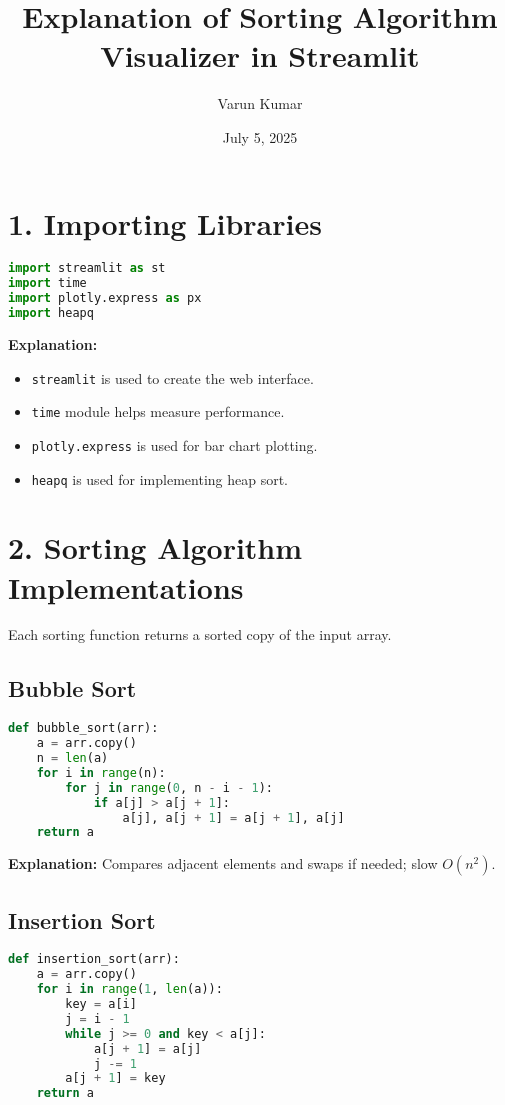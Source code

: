 \documentclass[14pt]{extarticle}
\title{Explanation of Sorting Algorithm Visualizer in Streamlit}
\author{Varun Kumar}
\date{July 5, 2025}
\begin{document}
\maketitle

\section*{1. Importing Libraries}
\begin{lstlisting}[language=Python]
import streamlit as st
import time
import plotly.express as px
import heapq
\end{lstlisting}

\textbf{Explanation:}
\begin{itemize}
  \item \texttt{streamlit} is used to create the web interface.
  \item \texttt{time} module helps measure performance.
  \item \texttt{plotly.express} is used for bar chart plotting.
  \item \texttt{heapq} is used for implementing heap sort.
\end{itemize}

\newpage
\section*{2. Sorting Algorithm Implementations}
Each sorting function returns a sorted copy of the input array.

\subsection*{Bubble Sort}
\begin{lstlisting}[language=Python]
def bubble_sort(arr):
    a = arr.copy()
    n = len(a)
    for i in range(n):
        for j in range(0, n - i - 1):
            if a[j] > a[j + 1]:
                a[j], a[j + 1] = a[j + 1], a[j]
    return a
\end{lstlisting}

\textbf{Explanation:} Compares adjacent elements and swaps if needed; slow $O(n^2)$.

\subsection*{Insertion Sort}
\begin{lstlisting}[language=Python]
def insertion_sort(arr):
    a = arr.copy()
    for i in range(1, len(a)):
        key = a[i]
        j = i - 1
        while j >= 0 and key < a[j]:
            a[j + 1] = a[j]
            j -= 1
        a[j + 1] = key
    return a
\end{lstlisting}
\end{document}
